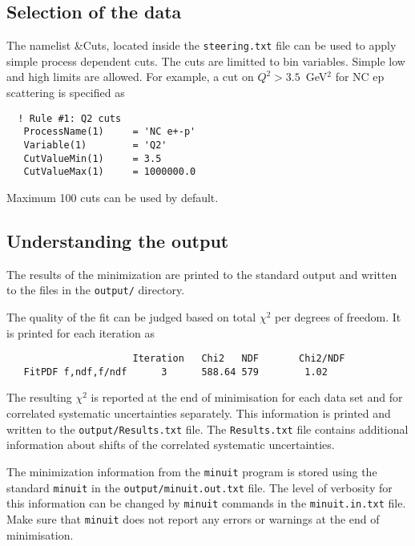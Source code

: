


\subsection{Selection of the data}
  The namelist \&Cuts, located inside the {\tt steering.txt} file can be used to apply
  simple process dependent cuts. The cuts are limitted to bin variables.
  Simple low and high limits are allowed. For example, a cut on $Q^2>3.5$~GeV$^2$ for
  NC ep scattering is specified as

\begin{verbatim}
  ! Rule #1: Q2 cuts
   ProcessName(1)     = 'NC e+-p'
   Variable(1)        = 'Q2'
   CutValueMin(1)     = 3.5 
   CutValueMax(1)     = 1000000.0
\end{verbatim}

  Maximum 100 cuts can be used by default.
\subsection{Understanding the output}
  The results of the minimization are printed to the standard output and written
  to the files in the {\tt output/} directory. 

  The quality of the fit can be judged based on total $\chi^2$ per degrees of freedom.
  It is printed for each iteration as 
\begin{verbatim}
                      Iteration   Chi2   NDF       Chi2/NDF
   FitPDF f,ndf,f/ndf      3      588.64 579        1.02
\end{verbatim}
  The resulting $\chi^2$ is reported at the end of minimisation for each data set and for correlated 
  systematic uncertainties separately. This information is printed and written
  to the {\tt output/Results.txt} file. The {\tt Results.txt} file contains additional 
  information about shifts of the correlated systematic uncertainties.

  The minimization information from the {\tt minuit} program is stored using the standard {\tt minuit} in the {\tt output/minuit.out.txt}
  file. The level of verbosity for this information can be changed by {\tt minuit} commands
  in the {\tt minuit.in.txt} file. Make sure that {\tt minuit} does not report any errors
  or warnings at the end of minimisation.
  
